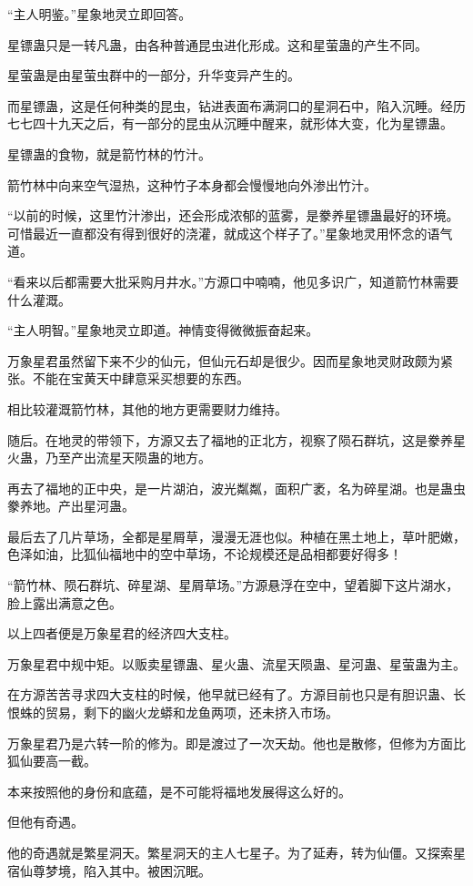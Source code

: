 \begin{this_body}
“主人明鉴。”星象地灵立即回答。

星镖蛊只是一转凡蛊，由各种普通昆虫进化形成。这和星萤蛊的产生不同。

星萤蛊是由星萤虫群中的一部分，升华变异产生的。

而星镖蛊，这是任何种类的昆虫，钻进表面布满洞口的星洞石中，陷入沉睡。经历七七四十九天之后，有一部分的昆虫从沉睡中醒来，就形体大变，化为星镖蛊。

星镖蛊的食物，就是箭竹林的竹汁。

箭竹林中向来空气湿热，这种竹子本身都会慢慢地向外渗出竹汁。

“以前的时候，这里竹汁渗出，还会形成浓郁的蓝雾，是豢养星镖蛊最好的环境。可惜最近一直都没有得到很好的浇灌，就成这个样子了。”星象地灵用怀念的语气道。

“看来以后都需要大批采购月井水。”方源口中喃喃，他见多识广，知道箭竹林需要什么灌溉。

“主人明智。”星象地灵立即道。神情变得微微振奋起来。

万象星君虽然留下来不少的仙元，但仙元石却是很少。因而星象地灵财政颇为紧张。不能在宝黄天中肆意采买想要的东西。

相比较灌溉箭竹林，其他的地方更需要财力维持。

随后。在地灵的带领下，方源又去了福地的正北方，视察了陨石群坑，这是豢养星火蛊，乃至产出流星天陨蛊的地方。

再去了福地的正中央，是一片湖泊，波光粼粼，面积广袤，名为碎星湖。也是蛊虫豢养地。产出星河蛊。

最后去了几片草场，全都是星屑草，漫漫无涯也似。种植在黑土地上，草叶肥嫩，色泽如油，比狐仙福地中的空中草场，不论规模还是品相都要好得多！

“箭竹林、陨石群坑、碎星湖、星屑草场。”方源悬浮在空中，望着脚下这片湖水，脸上露出满意之色。

以上四者便是万象星君的经济四大支柱。

万象星君中规中矩。以贩卖星镖蛊、星火蛊、流星天陨蛊、星河蛊、星萤蛊为主。

在方源苦苦寻求四大支柱的时候，他早就已经有了。方源目前也只是有胆识蛊、长恨蛛的贸易，剩下的幽火龙蟒和龙鱼两项，还未挤入市场。

万象星君乃是六转一阶的修为。即是渡过了一次天劫。他也是散修，但修为方面比狐仙要高一截。

本来按照他的身份和底蕴，是不可能将福地发展得这么好的。

但他有奇遇。

他的奇遇就是繁星洞天。繁星洞天的主人七星子。为了延寿，转为仙僵。又探索星宿仙尊梦境，陷入其中。被困沉眠。


\end{this_body}
